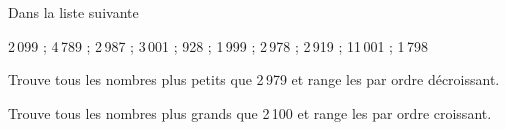 Dans la liste suivante
\begin{center}
2\,099 ; 4\,789 ; 2\,987 ; 3\,001 ; 928 ; 1\,999 ; 2\,978 ; 2\,919 ; 11\,001 ; 1\,798
\end{center}
\begin{myenumerate}
\item Trouve tous les nombres plus petits que 2\,979 et range les
par ordre décroissant.
\item Trouve tous les nombres plus grands que 2\,100 et range les
par ordre croissant.
\end{myenumerate}